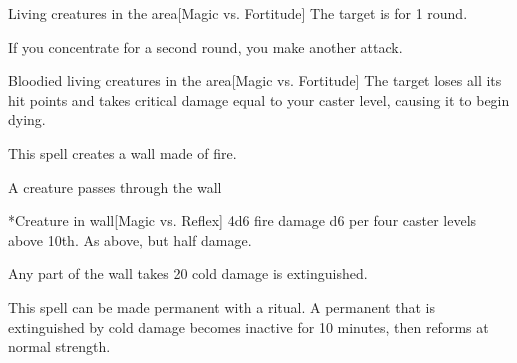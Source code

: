 \begin{spellheader}
\end{spellheader}
\begin{spelleffects}
    \begin{spelltargets}{Living creatures in the area}[Magic vs. Fortitude]
        \spellsuccess The target is \staggered for 1 round.
    \end{spelltargets}
    \spellspecial If you concentrate for a second round, you make another attack.
    \begin{spelltargets}{Bloodied living creatures in the area}[Magic vs. Fortitude]
        \spellsuccess The target loses all its hit points and takes critical damage equal to your caster level, causing it to begin dying.
    \end{spelltargets}
\end{spelleffects}
\begin{spellfooter}
    
\end{spellfooter}

\begin{spellheader}
    \spelldur{\durshort}
\end{spellheader}
\begin{spelleffects}
    \spelleffect This spell creates a wall made of fire.
    \begin{spelltrigger}{A creature passes through the wall}
        \begin{spelltarget}*{Creature in wall}[Magic vs. Reflex]
            \spellsuccess 4d6 fire damage \add d6 per four caster levels above 10th.
            \spellfailure As above, but half damage.
        \end{spelltarget}
    \end{spelltrigger}
\end{spelleffects}
\begin{spellfooter}
    \spellnotes Any part of the wall takes 20 cold damage is extinguished.

    This spell can be made permanent with a  ritual. A permanent  that is extinguished by cold damage becomes inactive for 10 minutes, then reforms at normal strength.
\end{spellfooter}

